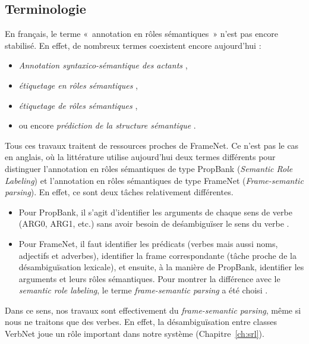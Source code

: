 \subsection{Terminologie}

En français, le terme «~annotation en rôles sémantiques~» n'est pas encore
stabilisé. En effet, de nombreux termes coexistent encore aujourd'hui :

\begin{itemize}
    \item \textit{Annotation syntaxico-sémantique des actants}
        \citep{hadouche2011annotation},
    \item \textit{étiquetage en rôles sémantiques} \citep{boros2014etiquetage},
    \item \textit{étiquetage de rôles sémantiques}
        \citep{lechelle2014utilisation},
    \item ou encore \textit{prédiction de la structure sémantique}
        \citep{michalon2014modelisation}.
\end{itemize}

Tous ces travaux traitent de ressources proches de FrameNet. Ce n'est pas le
cas en anglais, où la littérature utilise aujourd'hui deux termes différents
pour distinguer l'annotation en rôles sémantiques de type PropBank
(\textit{Semantic Role Labeling}) et l'annotation en rôles sémantiques de type
FrameNet (\textit{Frame-semantic parsing}). En effet, ce sont deux tâches
relativement différentes.

\begin{itemize}
    \item Pour PropBank, il s'agit d'identifier les arguments de chaque sens de
        verbe (ARG0, ARG1, etc.) sans avoir besoin de deśambiguïser le sens du
        verbe \citep{carreras2005introduction}.
    \item Pour FrameNet, il faut identifier les prédicats (verbes mais aussi
        noms, adjectifs et adverbes), identifier la frame correspondante (tâche
        proche de la désambiguïsation lexicale), et ensuite, à la manière de
        PropBank, identifier les arguments et leurs rôles sémantiques. Pour
        montrer la différence avec le \textit{semantic role labeling}, le terme
        \textit{frame-semantic parsing} a été choisi
        \citep{das2010probabilistic}.
\end{itemize}

Dans ce sens, nos travaux sont effectivement du \textit{frame-semantic
parsing}, même si nous ne traitons que des verbes. En effet, la
désambiguïsation entre classes VerbNet joue un rôle important dans notre
système (Chapitre~\ref{ch:srl}).


